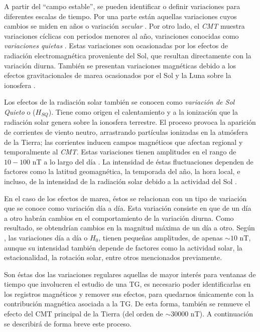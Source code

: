 A partir del ``campo estable'', se pueden identificar o definir variaciones para diferentes escalas de tiempo. Por una parte están aquellas variaciones cuyos cambios se miden en años o variación \emph{secular} \parencite{l_handbook_geof_sw_Geom_field}. Por otro lado, el \emph{CMT} muestra variaciones cíclicas con periodos menores al año, variaciones conocidas como \emph{variaciones quietas} \parencite{l_handbook_geof_sw_Geom_field}. Estas variaciones son ocasionadas por los efectos de radiación electromagnética proveniente del Sol, que resultan directamente con la variación diurna. También se presentan variaciones magnéticas debido a los efectos gravitacionales de marea ocasionados por el Sol y la Luna sobre la ionosfera \parencite{BARTELS_kp}.
\vspace{1 em}

Los efectos de la radiación solar también se conocen como \emph{variación de Sol Quieto} o ($H_{SQ}$). Tiene como origen el calentamiento y a la ionización que la radiación solar genera sobre la ionosfera terrestre. El proceso provoca la aparición de corrientes de viento neutro, arrastrando partículas ionizadas en la atmósfera de la Tierra; las corrientes inducen campos magnéticos que afectan regional y temporalmente al \emph{CMT}. Estas variaciones tienen amplitudes en el rango de $10-100$ nT a lo largo del día \parencite{iaga_guide, baseline_Gjerloev}. La intensidad de éstas fluctuaciones dependen de factores como la latitud geomagnética, la temporada del año, la hora local, e incluso, de la intensidad de la radiación solar debido a la actividad del Sol \parencite{iaga_guide, gombosi_1998, l_handbook_geof_sw_Geom_field}.\\
\vspace{1 em}

En el caso de los efectos de marea, éstos se relacionan con un tipo de variación que se conoce como variación día a día. Esta variación consiste en que de un día a otro habrán cambios en el comportamiento de la variación diurna. Como resultado, se obtendrían cambios en la magnitud máxima de un día a otro. Según \cite{iaga_guide}, las variaciones día a día o $H_0$, tienen pequeñas amplitudes, de apenas $\sim 10$ nT, aunque su intensidad también depende de factores como la actividad solar, la estacionalidad, la rotación solar, entre otros mencionados previamente. 
\vspace{1 em}

Son éstas dos las variaciones regulares aquellas de mayor interés para ventanas de tiempo que involucren el estudio de una TG, es necesario poder identificarlas en los registros magnéticos y remover sus efectos, para quedarnos únicamente con la contribución magnética asociada a la TG. De esta forma, también se remueve el efecto del CMT principal de la Tierra (del orden de $\sim 30 000$ nT). A continuación se describirá de forma breve este proceso.


